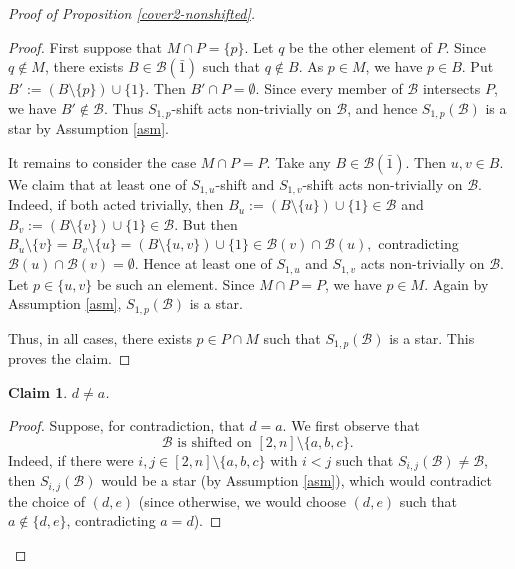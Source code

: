 \documentclass[a4paper,11pt]{article}
\newtheorem{claim}[theorem]{Claim}
\newcommand{\m}{\mathcal}
\begin{document}
\begin{proof}[Proof of Proposition \ref{cover2-nonshifted}]
\begin{proof}
First suppose that $M\cap P=\{p\}$. Let $q$ be the other element of
$P$. Since $q\notin M$, there exists $B\in\mathcal B(\bar1)$ such that
$q\notin B$. As $p\in M$, we have $p\in B$. Put $B':=(B\setminus\{p\})\cup\{1\}.$
Then $B'\cap P=\emptyset$. Since every member of $\mathcal B$ intersects
$P$, we have $B'\notin\mathcal B$. Thus $S_{1,p}$-shift acts
non-trivially on $\mathcal B$, and hence $S_{1,p}(\mathcal B)$ is a star by Assumption \ref{asm}.

It remains to consider the case $M\cap P=P$. Take any
$B\in\mathcal B(\bar1)$. Then $u,v\in B$. We claim that at least one of
$S_{1,u}$-shift and $S_{1,v}$-shift acts non-trivially on $\mathcal B$. Indeed,
if both acted trivially, then $B_u:=(B\setminus\{u\})\cup\{1\}\in\mathcal B$ and $B_v:=(B\setminus\{v\})\cup\{1\}\in\mathcal B.$ 
But then $B_u\setminus\{v\}=B_v\setminus\{u\}=(B\setminus\{u,v\})\cup\{1\}\in \mathcal B(v)\cap\mathcal B(u),$
contradicting $\mathcal B(u)\cap\mathcal B(v)=\emptyset$. Hence at least one of
$S_{1,u}$ and $S_{1,v}$ acts non-trivially on $\mathcal B$. Let
$p\in\{u,v\}$ be such an element. Since $M\cap P=P$, we have $p\in M$.
Again by Assumption \ref{asm}, $S_{1,p}(\mathcal B)$ is a star.

Thus, in all cases, there exists $p\in P\cap M$ such that $S_{1,p}(\mathcal B)$ is a star. This proves the claim.
\end{proof}


\begin{claim}\label{dnea}
$d\ne a$.
\end{claim}


\begin{proof}
Suppose, for contradiction, that $d=a$. We first observe that 
\begin{equation}\label{b-shifted-2-n}
\text{$\m B$ is shifted on $[2,n]\setminus \{a,b,c\}$. }
\end{equation}
Indeed, if there were $i,j\in [2,n]\setminus \{a,b,c\}$ with $i<j$ such that
$S_{i,j}(\mathcal B)\ne\mathcal B$, then $S_{i,j}(\mathcal B)$ would be a star (by Assumption \ref{asm}), which would contradict the choice of $(d,e)$ (since otherwise, we would choose $(d,e)$ such that $a\not\in \{d,e\}$, contradicting $a=d$).


\end{proof}
\end{proof}
\end{document}
